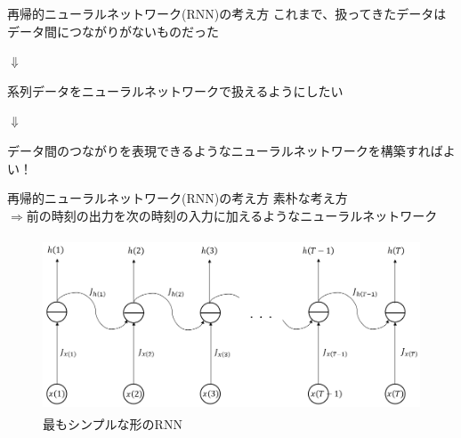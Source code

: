 \documentclass[dvipdfmx,10pt]{beamer}
\begin{document}
  \begin{frame}{再帰的ニューラルネットワーク(RNN)の考え方}
    これまで、扱ってきたデータはデータ間につながりがないものだった
    \begin{center}
      $\Downarrow$
    \end{center}
    系列データをニューラルネットワークで扱えるようにしたい\\
    \begin{center}
      $\Downarrow$
    \end{center}
    データ間のつながりを表現できるようなニューラルネットワークを構築すればよい！
  \end{frame}

  \begin{frame}{再帰的ニューラルネットワーク(RNN)の考え方}
    素朴な考え方\\
    $\Rightarrow$前の時刻の出力を次の時刻の入力に加えるようなニューラルネットワーク
    \begin{figure}
      \begin{center}
        \includegraphics[height=5.2cm]{simple_RNN.png}
      \end{center} 
      \caption{最もシンプルな形のRNN}  
    \end{figure}
  \end{frame}
\end{document}
